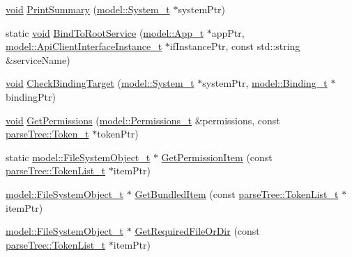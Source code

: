 \begin{DoxyCompactItemize}
\item 
\hyperlink{_t_e_m_p_l_a_t_e__cdef_8h_ac9c84fa68bbad002983e35ce3663c686}{void} \hyperlink{namespacemodeller_a37ac66095945037fa1883524913b6873}{Print\+Summary} (\hyperlink{structmodel_1_1_system__t}{model\+::\+System\+\_\+t} $\ast$system\+Ptr)
\item 
static \hyperlink{_t_e_m_p_l_a_t_e__cdef_8h_ac9c84fa68bbad002983e35ce3663c686}{void} \hyperlink{namespacemodeller_a70fca1610dea3d6de68229926addd7c3}{Bind\+To\+Root\+Service} (\hyperlink{structmodel_1_1_app__t}{model\+::\+App\+\_\+t} $\ast$app\+Ptr, \hyperlink{structmodel_1_1_api_client_interface_instance__t}{model\+::\+Api\+Client\+Interface\+Instance\+\_\+t} $\ast$if\+Instance\+Ptr, const std\+::string \&service\+Name)
\item 
\hyperlink{_t_e_m_p_l_a_t_e__cdef_8h_ac9c84fa68bbad002983e35ce3663c686}{void} \hyperlink{namespacemodeller_af5403b62383c54efac5b9f4f884c167e}{Check\+Binding\+Target} (\hyperlink{structmodel_1_1_system__t}{model\+::\+System\+\_\+t} $\ast$system\+Ptr, \hyperlink{structmodel_1_1_binding__t}{model\+::\+Binding\+\_\+t} $\ast$binding\+Ptr)
\item 
\hyperlink{_t_e_m_p_l_a_t_e__cdef_8h_ac9c84fa68bbad002983e35ce3663c686}{void} \hyperlink{namespacemodeller_ad62b123b0eb8eb4086804b16825f5240}{Get\+Permissions} (\hyperlink{structmodel_1_1_permissions__t}{model\+::\+Permissions\+\_\+t} \&permissions, const \hyperlink{structparse_tree_1_1_token__t}{parse\+Tree\+::\+Token\+\_\+t} $\ast$token\+Ptr)
\item 
static \hyperlink{structmodel_1_1_file_system_object__t}{model\+::\+File\+System\+Object\+\_\+t} $\ast$ \hyperlink{namespacemodeller_a20517f06ef48997d7cc12091058847b1}{Get\+Permission\+Item} (const \hyperlink{structparse_tree_1_1_token_list__t}{parse\+Tree\+::\+Token\+List\+\_\+t} $\ast$item\+Ptr)
\item 
\hyperlink{structmodel_1_1_file_system_object__t}{model\+::\+File\+System\+Object\+\_\+t} $\ast$ \hyperlink{namespacemodeller_a87b9e6512ba071f40c53d6ef40dc1b9c}{Get\+Bundled\+Item} (const \hyperlink{structparse_tree_1_1_token_list__t}{parse\+Tree\+::\+Token\+List\+\_\+t} $\ast$item\+Ptr)
\item 
\hyperlink{structmodel_1_1_file_system_object__t}{model\+::\+File\+System\+Object\+\_\+t} $\ast$ \hyperlink{namespacemodeller_a18566cf670e863a5572a7067b800c6ef}{Get\+Required\+File\+Or\+Dir} (const \hyperlink{structparse_tree_1_1_token_list__t}{parse\+Tree\+::\+Token\+List\+\_\+t} $\ast$item\+Ptr)
\item 

\end{DoxyCompactItemize}
